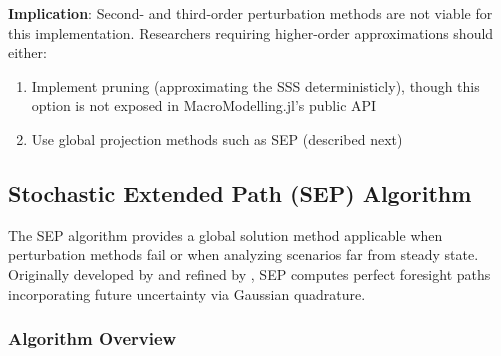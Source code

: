 \documentclass[12pt]{article}
\begin{document}
\textbf{Implication}: Second- and third-order perturbation methods are not viable for this implementation. Researchers requiring higher-order approximations should either:
\begin{enumerate}
\item Implement pruning (approximating the SSS deterministicly), though this option is not exposed in MacroModelling.jl's public API
\item Use global projection methods such as SEP (described next)
\end{enumerate}

\subsection{Stochastic Extended Path (SEP) Algorithm}\label{sec:sep_algorithm}

The SEP algorithm provides a global solution method applicable when perturbation methods fail or when analyzing scenarios far from steady state. Originally developed by \citet{fair1983solution} and refined by \citet{adjemian2013stochastic}, SEP computes perfect foresight paths incorporating future uncertainty via Gaussian quadrature.

\subsubsection{Algorithm Overview}
\end{document}
